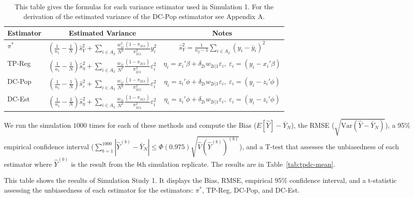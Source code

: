 \documentclass[12pt]{article}
\newcommand{\Var}{{\text{Var}}}
\begin{document}
\begin{table}[ht!]
  \centering
  \begin{tabular}{lcc}
    \toprule
    Estimator & Estimated Variance & Notes \\
    \midrule
    $\pi^*$ 
    & {\scriptsize$\left(\frac{1}{n_1} - \frac{1}{N}\right) \hat s^2_Y + 
      \sum\limits_{i \in A_2} \frac{w_{1i}^2}{N^2} 
        \frac{(1 - \pi_{2i|1})}{\pi_{2i|1}^2}y_i^2$}
    & {\scriptsize$\hat s^2_Y = \frac{1}{n_2 - 1}\sum\limits_{i \in A_2} (y_i -
    \bar y_i)^2$} \\
    TP-Reg  
    & {\scriptsize$\left(\frac{1}{n_1} - \frac{1}{N}\right) \hat s^2_\eta + 
      \sum\limits_{i \in A_2} \frac{w_{1i}}{N^2} 
        \frac{(1 - \pi_{2i|1})}{\pi_{2i|1}^2}\varepsilon_i^2$}
    & {\scriptsize$ \eta_i = x_i'\beta + \delta_{2i} w_{2i|1}\varepsilon_i,\;
        \varepsilon_i = (y_i - x_i' \beta)$} \\
    DC-Pop  
    & {\scriptsize$\left(\frac{1}{n_1} - \frac{1}{N}\right) \hat s^2_\varepsilon + 
      \sum\limits_{i \in A_2} \frac{w_{1i}}{N^2} 
        \frac{(1 - \pi_{2i|1})}{\pi_{2i|1}^2}\varepsilon_i^2$}
    & {\scriptsize$\eta_i = z_i' \phi + \delta_{2i}w_{2i|1}\varepsilon_i,\;
        \varepsilon_i = (y_i - z_i'\phi)$} \\
    DC-Est  
    & {\scriptsize$\left(\frac{1}{n_1} - \frac{1}{N}\right) \hat s^2_\eta + 
      \sum\limits_{i \in A_2} \frac{w_{1i}}{N^2} 
        \frac{(1 - \pi_{2i|1})}{\pi_{2i|1}^2}\varepsilon_i^2$}
    & {\scriptsize$\eta_i = z_i' \phi + \delta_{2i}w_{2i|1}\varepsilon_i,\;
        \varepsilon_i = (y_i - z_i' \phi)$} \\
    \bottomrule
  \end{tabular}
  \caption{This table gives the formulas for each variance estimator used in
  Simulation 1. For the derivation of the estimated variance of the DC-Pop
estimatator see Appendix A.}
  \label{tab:varforms}
\end{table}

We run the simulation $1000$ times for each of these methods and compute the
Bias ($E[\hat Y] - \bar Y_N$), the RMSE ($\sqrt{\Var(\hat Y - \bar Y_N)}$), a 95\%
empirical confidence interval ($\sum_{b = 1}^{1000} |\hat Y^{(b)} - \bar Y_N| \leq 
\Phi(0.975)\sqrt{\hat V(\hat Y^{(b)})^{(b)}}$), and a T-test that assesses the
unbiasedness of each estimator where $\hat Y^{(b)}$ is the result from the $b$th
simulation replicate. The results are in Table~\ref{tab:tpdc-mean}.

\begin{table}[ht!]
  \centering

\caption{This table shows the results of Simulation Study 1. It displays the
Bias, RMSE, empirical 95\% confidence interval, and a t-statistic assessing the
unbiasedness of each estimator for the estimators: $\pi^*$, TP-Reg, DC-Pop, and
DC-Est.}
\label{tab:tpdc-mean}
\end{table}
\end{document}
